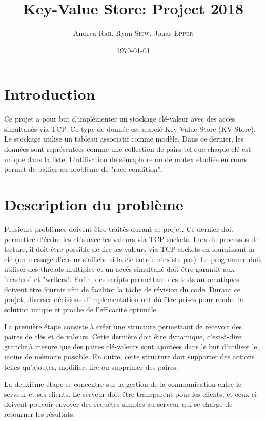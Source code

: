 \documentclass[11pt,a4paper]{article}
\title{\vspace{-10em}Key-Value Store: Project 2018}
\date{\today}
\author{Andrea \textsc{Rar}, Ryan \textsc{Siow}, Jonas \textsc{Epper}}
\newcommand{\emailurl}[1]{\href{mailto:#1}{#1}}
\renewcommand\maketitle{
\begin{center}%
    {\Huge \thetitle \vspace \baselineskip \par}%
    {\Large \theauthor \vspace \baselineskip \par}%
\myaddress
\emailurl{\myemail}
\end{center}
}
\begin{document}
\maketitle
\thispagestyle{empty}

\renewcommand{\contentsname}{\Large Table des matières}
\renewcommand{\baselinestretch}{0.75}\normalsize
\tableofcontents %
\newpage
\section{Introduction}
Ce projet a pour but d'implémenter un stockage clé-valeur avec des accès simultanés via TCP. Ce type de donnée est appelé Key-Value Store (KV Store). Le stockage utilise un tableau associatif comme modèle. Dans ce dernier, les données sont représentées comme une collection de pairs tel que chaque clé est unique dans la liste. L'utilisation de sémaphore ou de mutex étudiée en cours permet de pallier au problème de "race condition". 

\section{Description du problème}
Plusieurs problèmes doivent être traités durant ce projet. Ce dernier doit permettre d'écrire les clés avec les valeurs via TCP sockets. Lors du processus de lecture, il doit être possible de lire les valeurs via TCP sockets en fournissant la clé (un message d'erreur s'affiche si la clé entrée n'existe pas). Le programme doit utiliser des threads multiples et un accès simultané doit être garantit aux "readers" et "writers". Enfin, des scripts permettant des tests automatiques doivent être fournis afin de faciliter la tâche de révision du code. Durant ce projet, diverses décisions d'implémentation ont dû être prises pour rendre la solution unique et proche de l'efficacité optimale.

La première étape consiste à créer une structure permettant de recevoir des paires de clés et de valeurs. Cette dernière doit être dynamique, c'est-à-dire grandir à mesure que des paires clé-valeurs sont ajoutées dans le but d'utiliser le moins de mémoire possible. En outre, cette structure doit supporter des actions telles qu'ajouter, modifier, lire ou supprimer des paires.

La deuxième étape se concentre sur la gestion de la communication entre le serveur et ses clients. Le serveur doit être transparent pour les clients, et ceux-ci doivent pouvoir envoyer des requêtes simples au serveur qui se charge de retourner les résultats.
\end{document}
